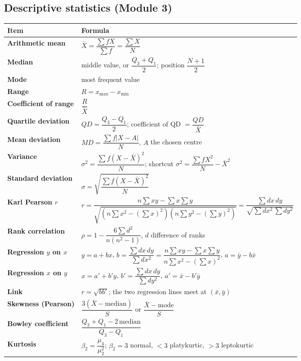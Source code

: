 \documentclass[11pt,a4paper]{article}
\begin{document}
\subsection{Descriptive statistics (Module 3)}
\begin{center}\small
\begin{tabularx}{\textwidth}{>{\bfseries}p{} X}
\toprule Item & Formula\\\midrule
Arithmetic mean & $\bar X=\dfrac{\sum fX}{\sum f}=\dfrac{\sum X}{N}$\\
Median & middle value, or $\dfrac{Q_3+Q_1}{2}$; position $\dfrac{N+1}{2}$\\
Mode & most frequent value\\
Range & $R=x_{\max}-x_{\min}$\\
Coefficient of range & $\dfrac{R}{\bar X}$\\
Quartile deviation & $QD=\dfrac{Q_3-Q_1}{2}$; coefficient of QD $=\dfrac{QD}{\bar X}$\\
Mean deviation & $MD=\dfrac{\sum f|X-A|}{N}$, $A$ the chosen centre\\
Variance & $\sigma^2=\dfrac{\sum f(X-\bar X)^2}{N}$; shortcut $\sigma^2=\dfrac{\sum fX^2}{N}-\bar X^2$\\
Standard deviation & $\sigma=\sqrt{\dfrac{\sum f(X-\bar X)^2}{N}}$\\
Karl Pearson $r$ & $r=\dfrac{n\sum xy-\sum x\sum y}{\sqrt{(n\sum x^2-(\sum x)^2)(n\sum y^2-(\sum y)^2)}}=\dfrac{\sum dx\,dy}{\sqrt{\sum dx^2\,\sum dy^2}}$\\
Rank correlation & $\rho=1-\dfrac{6\sum d^2}{n(n^2-1)}$, $d$ difference of ranks\\
Regression $y$ on $x$ & $y=a+bx$, $b=\dfrac{\sum dx\,dy}{\sum dx^2}=\dfrac{n\sum xy-\sum x\sum y}{n\sum x^2-(\sum x)^2}$, $a=\bar y-b\bar x$\\
Regression $x$ on $y$ & $x=a'+b'y$, $b'=\dfrac{\sum dx\,dy}{\sum dy^2}$, $a'=\bar x-b'\bar y$\\
Link & $r=\sqrt{bb'}$; the two regression lines meet at $(\bar x,\bar y)$\\
Skewness (Pearson) & $\dfrac{3(\bar X-\text{median})}{S}$ or $\dfrac{\bar X-\text{mode}}{S}$\\
Bowley coefficient & $\dfrac{Q_3+Q_1-2\,\text{median}}{Q_3-Q_1}$\\
Kurtosis & $\beta_2=\dfrac{\mu_4}{\mu_2^2}$; $\beta_2=3$ normal, $<3$ platykurtic, $>3$ leptokurtic\\\bottomrule
\end{tabularx}
\end{center}
\end{document}
